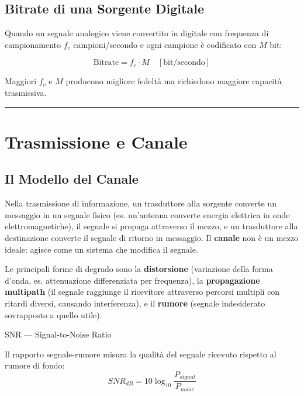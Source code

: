 \documentclass[
  italian,
  openany]{book}
\begin{document}
\subsection{Bitrate di una Sorgente
Digitale}\label{bitrate-di-una-sorgente-digitale}

Quando un segnale analogico viene convertito in digitale con frequenza
di campionamento \(f_c\) campioni/secondo e ogni campione è codificato
con \(M\) bit:

\[\text{Bitrate} = f_c \cdot M \quad [\text{bit/secondo}]\]

Maggiori \(f_c\) e \(M\) producono migliore fedeltà ma richiedono
maggiore capacità trasmissiva.

\begin{center}\rule{0.5\linewidth}{0.5pt}\end{center}

\section{Trasmissione e Canale}\label{trasmissione-e-canale}

\subsection{Il Modello del Canale}\label{il-modello-del-canale}

Nella trasmissione di informazione, un trasduttore alla sorgente
converte un messaggio in un segnale fisico (es. un'antenna converte
energia elettrica in onde elettromagnetiche), il segnale si propaga
attraverso il mezzo, e un trasduttore alla destinazione converte il
segnale di ritorno in messaggio. Il \textbf{canale} non è un mezzo
ideale: agisce come un sistema che modifica il segnale.

Le principali forme di degrado sono la \textbf{distorsione} (variazione
della forma d'onda, es. attenuazione differenziata per frequenza), la
\textbf{propagazione multipath} (il segnale raggiunge il ricevitore
attraverso percorsi multipli con ritardi diversi, causando
interferenza), e il \textbf{rumore} (segnale indesiderato sovrapposto a
quello utile).

\begin{calloutdefinition}{SNR — Signal-to-Noise Ratio}

Il rapporto segnale-rumore misura la qualità del segnale ricevuto
rispetto al rumore di fondo:
\[SNR_{dB} = 10 \log_{10} \frac{P_{signal}}{P_{noise}}\]

\end{calloutdefinition}
\end{document}

